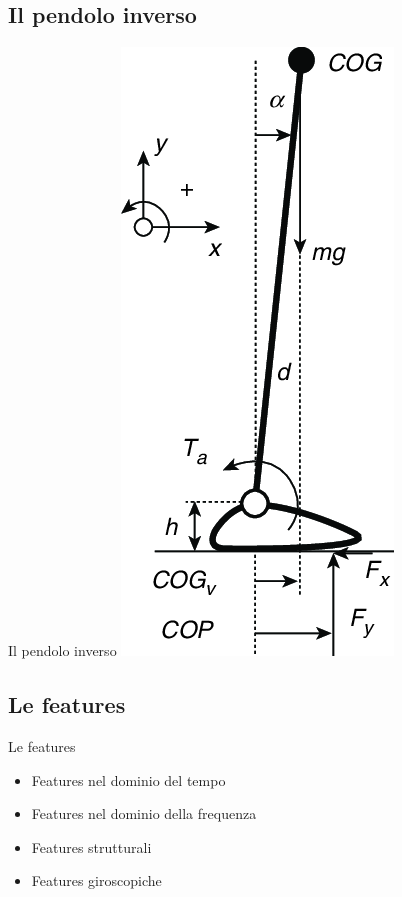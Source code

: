 \documentclass{beamer}
\begin{document}
    \subsection{Il pendolo inverso}
    \begin{frame}{Il pendolo inverso}
        \centering
        \includegraphics[scale=.35]{../figures/single_inverted_pendulum.png}
    \end{frame}

    \subsection{Le features}
    \begin{frame}{Le features}
        \begin{itemize}
            \item Features nel dominio del tempo
            \pause
            \item Features nel dominio della frequenza
            \pause
            \item Features strutturali
            \pause
            \item Features giroscopiche
        \end{itemize}
    \end{frame}
\end{document}
